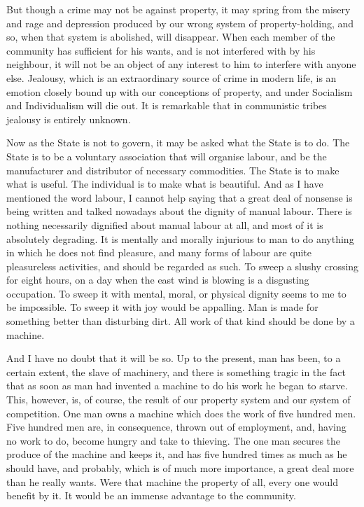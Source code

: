 But though a crime may not be against property, it may spring from the misery and rage and depression produced by our wrong system of property-holding, and so, when that system is abolished, will disappear. When each member of the community has sufficient for his wants, and is not interfered with by his neighbour, it will not be an object of any interest to him to interfere with anyone else. Jealousy, which is an extraordinary source of crime in modern life, is an emotion closely bound up with our conceptions of property, and under Socialism and Individualism will die out. It is remarkable that in communistic tribes jealousy is entirely unknown.\par

Now as the State is not to govern, it may be asked what the State is to do. The State is to be a voluntary association that will organise labour, and be the manufacturer and distributor of necessary commodities. The State is to make what is useful. The individual is to make what is beautiful. And as I have mentioned the word labour, I cannot help saying that a great deal of nonsense is being written and talked nowadays about the dignity of manual labour. There is nothing necessarily dignified about manual labour at all, and most of it is absolutely degrading. It is mentally and morally injurious to man to do anything in which he does not find pleasure, and many forms of labour are quite pleasureless activities, and should be regarded as such. To sweep a slushy crossing for eight hours, on a day when the east wind is blowing is a disgusting occupation. To sweep it with mental, moral, or physical dignity seems to me to be impossible. To sweep it with joy would be appalling. Man is made for something better than disturbing dirt. All work of that kind should be done by a machine.\par

And I have no doubt that it will be so. Up to the present, man has been, to a certain extent, the slave of machinery, and there is something tragic in the fact that as soon as man had invented a machine to do his work he began to starve. This, however, is, of course, the result of our property system and our system of competition. One man owns a machine which does the work of five hundred men. Five hundred men are, in consequence, thrown out of employment, and, having no work to do, become hungry and take to thieving. The one man secures the produce of the machine and keeps it, and has five hundred times as much as he should have, and probably, which is of much more importance, a great deal more than he really wants. Were that machine the property of all, every one would benefit by it. It would be an immense advantage to the community.\par

